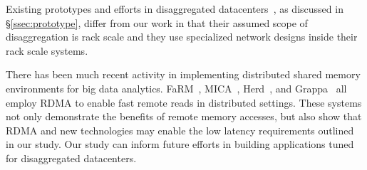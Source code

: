 {%
Existing prototypes and efforts in disaggregated datacenters~\cite{hptm, rsa,fdr,firebox,seamicro,catapult}, as discussed in \S\ref{ssec:prototype}, differ from our work in that their assumed scope of disaggregation is rack scale and they use specialized network designs inside their rack scale systems. 


There has been much recent activity in implementing distributed shared memory environments for big data analytics. FaRM~\cite{farm}, MICA~\cite{mica}, Herd~\cite{herd}, and Grappa~\cite{grappa} all employ RDMA to enable fast remote reads in distributed settings. These systems not only demonstrate the benefits of remote memory accesses, but also show that RDMA and new technologies may enable the low latency requirements outlined in our study. Our study can inform future efforts in building applications tuned for disaggregated datacenters.









}
